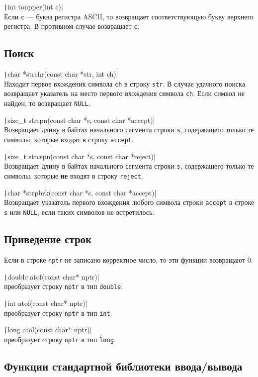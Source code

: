 \texttt|int toupper(int c)| \\
Если \verb|c| --- буква регистра ASCII, то возвращает соответствующую букву верхнего регистра. В противном
случае возвращает \verb|c|.

\subsection{Поиск}
\texttt|char *strchr(const char *str, int ch)| \\
Находит первое вхожденик символа \verb|сh| в строку \verb|str|.
В случае удачного поиска возвращает указатель на место первого
вхождения символа \verb|сh|. Если символ не найден, то возвращает \verb|NULL|.

\texttt|size_t strspn(const char *s, const char *accept)|\\
Возвращает длину в байтах начального сегмента строки \verb|s|, содержащего
только те символы, которые входят в строку \verb|accept|.

\texttt|size_t strcspn(const char *s, const char *reject)|\\
Возвращает длину в байтах начального сегмента строки \verb|s|, содержащего
только те символы, которые \textbf{не} входят в строку \verb|reject|.

\texttt|char *strpbrk(const char *s, const char *accept)|\\
Возвращает указатель  первого вхождения любого символа строки \verb|accept| в строке \verb|s|
или \verb|NULL|, если таких символов не встретилось.

\subsection{Приведение строк}
Если в строке \verb|nptr| не записано корректное число, то эти функции
возвращают 0.

\texttt|double atof(const char* nptr)|\\
преобразует строку \verb|nptr| в тип \verb|double|.

\texttt|int atoi(const char* nptr)|\\
преобразует строку \verb|nptr| в тип \verb|int|.

\texttt|long atol(const char* nptr)|\\
преобразует строку \verb|nptr| в тип \verb|long|.

\subsection{Функции стандартной библиотеки ввода/вывода}

